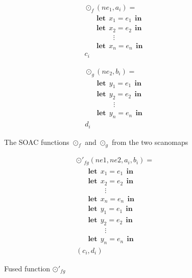 \documentclass[11pt,bibliography=totocnumbered]{article}
\newcommand\lett{\phantom{-}\:\:\mathbf{let}\:\:}
\newcommand\inn{\:\:\mathbf{in}\:\:}
\begin{document}
 \begin{figure}[hb!]

   \begin{mdframed}
 \begin{minipage}{0.5\linewidth}
     \centering

       \begin{align*}
       &\odot_f(ne_1, a_i) = \\
       &\lett x_1 = e_1 \inn\\
       &\lett x_2 = e_2 \inn\\
       &\phantom{----}\vdots\\
       &\lett x_n = e_n \inn\\
       &c_i
       \end{align*}

     \label{fig:mapf}
 \end{minipage}
 \begin{minipage}{0.5\linewidth}
     \centering

     \begin{align*}
       &\odot_g(ne_2, b_i) = \\
       &\lett y_1 = e_1 \inn\\
       &\lett y_2 = e_2 \inn\\
       &\phantom{----}\vdots\\
       &\lett y_n = e_n \inn\\
       &d_i
     \end{align*}

     \label{fig:odotg}
   \end{minipage}

     \end{mdframed}
     \caption{The SOAC functions $\odot_f$ and $\odot_g$ from the two scanomaps}
     \label{fig:pre-fusion}
\end{figure}

\begin{figure}[hb!]

   \begin{mdframed}
     \centering

       \begin{align*}
       &\odot'_{fg}(ne1, ne2, a_i, b_i ) = \\
       &\lett x_1 = e_1 \inn\\
       &\lett x_2 = e_2 \inn\\
       &\phantom{----}\vdots\\
       &\lett x_n = e_n \inn\\
       &\lett y_1 = e_1 \inn\\
       &\lett y_2 = e_2 \inn\\
       &\phantom{----}\vdots\\
       &\lett y_n = e_n \inn\\
       &(c_i, d_i)
       \end{align*}
       \end{mdframed}
     \caption{Fused function $\odot'_{fg}$}
     \label{fig:post-fusion}
\end{figure}
\end{document}
